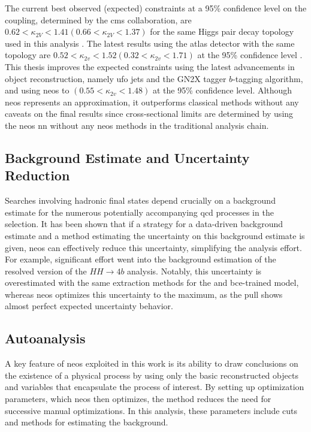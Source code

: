 The current best observed (expected) constraints at a 95\% confidence level on the \ktwov coupling, determined by the \ac{cms} collaboration, are $0.62 < \kappa_{2V} < 1.41 (0.66 < \kappa_{2V}< 1.37)$ for the same Higgs pair decay topology used in this analysis \citep{PhysRevLett.131.041803}. The latest results using the \ac{atlas} detector with the same topology are $0.52 < \kappa_{2v}< 1.52 (0.32 < \kappa_{2v}< 1.71)$ at the 95\% confidence level \citep{atlascollaboration2024searchpairproductionboosted}. This thesis improves the expected constraints using the latest advancements in object reconstruction, namely \ac{ufo} jets and the GN2X tagger $b$-tagging algorithm, and using \ac{neos} to $(0.55 < \kappa_{2v}< 1.48)$ at the 95\% confidence level. Although \ac{neos} represents an approximation, it outperforms classical methods without any caveats on the final results since cross-sectional limits are determined by using the \ac{neos} \ac{nn} without any \ac{neos} methods in the traditional analysis chain.


\subsection{Background Estimate and Uncertainty Reduction}
Searches involving hadronic final states depend crucially on a background estimate for the numerous potentially accompanying \ac{qcd} processes in the selection. It has been shown that if a strategy for a data-driven background estimate and a method estimating the uncertainty on this background estimate is given, \ac{neos} can effectively reduce this uncertainty, simplifying the analysis effort. For example, significant effort went into the background estimation of the resolved version of the $HH\rightarrow 4b$ analysis. Notably, this uncertainty is overestimated with the same extraction methods for the \mhh and \ac{bce}-trained model, whereas \ac{neos} optimizes this uncertainty to the maximum, as the pull shows almost perfect expected uncertainty behavior.

\subsection{Autoanalysis}
A key feature of \ac{neos} exploited in this work is its ability to draw conclusions on the existence of a physical process by using only the basic reconstructed objects and variables that encapsulate the process of interest. By setting up optimization parameters, which \ac{neos} then optimizes, the method reduces the need for successive manual optimizations. In this analysis, these parameters include cuts and methods for estimating the background.

